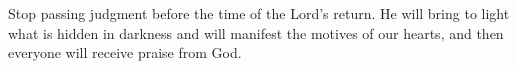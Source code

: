 
\lettrine{S}{}top passing judgment before the time of the Lord’s return. He will bring to light what is hidden in darkness and will manifest the motives of our hearts, and then everyone will receive praise from God.
